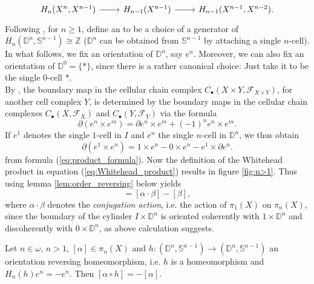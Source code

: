\begin{equation*}
	\begin{tikzcd}
		H_n(X^n,X^{n - 1}) \arrow[r] & H_{n - 1}(X^{n - 1}) \arrow[r] & H_{n - 1}(X^{n - 1},X^{n - 2}).
	\end{tikzcd}
\end{equation*}
Following \cite[269]{hatcher:algebraic_topology:2001}, for $n \geq 1$, define an  to be a choice of a generator of $H_n(\mathbb{D}^n,\mathbb{S}^{n - 1}) \cong \mathbb{Z}$ ($\mathbb{D}^n$ can be obtained from $\mathbb{S}^{n - 1}$ by attaching a single $n$-cell). In what follows, we fix an orientation of $\mathbb{D}^n$, say $e^n$. Moreover, we can also fix an orientation of $\mathbb{D}^0 = \{\ast\}$, since there is a rather canonical choice: Just take it to be the single $0$-cell $\ast$.\\
By \cite[269]{hatcher:algebraic_topology:2001}, the boundary map in the cellular chain complex $C_\bullet(X \times Y, \mathcal{F}_{X \times Y})$, for another cell complex $Y$, is determined by the boundary maps in the cellular chain complexes $C_\bullet(X,\mathcal{F}_X)$ and $C_\bullet(Y,\mathcal{F}_Y)$ via the formula
\begin{equation}
	\label{eq:product_formula}
	\partial(e^n \times e^m) = \partial e^n \times e^m + (-1)^ne^n \times e^m.
\end{equation}
If $e^1$ denotes the single $1$-cell in $I$ and $e^n$ the single $n$-cell in $\mathbb{D}^n$, we thus obtain
\begin{equation*}
	\partial(e^1 \times e^n) = 1 \times e^n - 0 \times e^n - e^1 \times \partial e^n.
\end{equation*}
\noindent from formula (\ref{eq:product_formula}). Now the definition of the Whitehead product in equation (\ref{eq:Whitehead_product}) results in figure \ref{fig:n>1}. Thus using lemma \ref{lem:order_reversing} below yields
\begin{equation*}
	[\alpha,\beta] = [\alpha \cdot \beta] - [\beta],
\end{equation*}
\noindent where $\alpha \cdot \beta$ denotes the \emph{conjugation action}, i.e. the action of $\pi_1(X)$ on $\pi_n(X)$, since the boundary of the cylinder $I \times \mathbb{D}^n$ is oriented coherently with $1 \times \mathbb{D}^n$ and discoherently with $0 \times \mathbb{D}^n$, as above calculation suggests.
\begin{lemma}
	\label{lem:order_reversing}
	Let $n \in \omega$, $n > 1$, $[\alpha] \in \pi_n(X)$ and $h : (\mathbb{D}^n,\mathbb{S}^{n - 1}) \to (\mathbb{D}^n,\mathbb{S}^{n - 1})$ an orientation reversing homeomorphism, i.e. $h$ is a homeomorphism and $H_n(h)e^n = - e^n$. Then $[\alpha \circ h] = -[\alpha]$.
\end{lemma}

